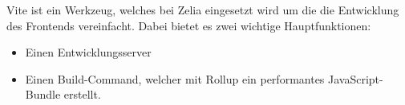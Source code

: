 

Vite ist ein Werkzeug, welches bei Zelia eingesetzt wird um die die Entwicklung des Frontends vereinfacht. Dabei bietet es zwei wichtige Hauptfunktionen\cite{ViteOverview}:

\begin{itemize}
    \item Einen Entwicklungsserver
    \item Einen Build-Command, welcher mit Rollup ein performantes JavaScript-Bundle erstellt.
\end{itemize}



